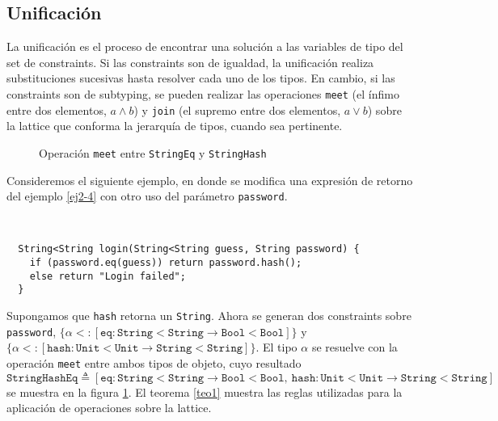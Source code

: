 \subsection{Unificación}
La unificación es el proceso de encontrar una solución a las variables de tipo del set de constraints. Si las constraints son de igualdad, la unificación realiza substituciones sucesivas hasta resolver cada uno de los tipos. En cambio, si las constraints son de subtyping, se pueden realizar las operaciones \texttt{meet} (el ínfimo entre dos elementos, $a \wedge b$) y \texttt{join} (el supremo entre dos elementos, $a \vee b$) sobre la lattice que conforma la jerarquía de tipos, cuando sea pertinente.

\begin{figure}[ht]
  \centering
  \caption{Operación \texttt{meet} entre \texttt{StringEq} y \texttt{StringHash}}
  \label{latticeInference}
\end{figure}

Consideremos el siguiente ejemplo, en donde se modifica una expresión de retorno del ejemplo \ref{ej2-4} con otro uso del parámetro \texttt{password}.

\begin{ej} \ \\
  \normalfont
  \label{ej2-5}
\begin{lstlisting}
  String<String login(String<String guess, String password) {
  	if (password.eq(guess)) return password.hash();
  	else return "Login failed";
  }
\end{lstlisting}
\end{ej}

Supongamos que \texttt{hash} retorna un \texttt{String}. Ahora se generan dos constraints sobre \texttt{password}, $\{\alpha <: [\mathtt{eq} : \mathtt{String<String} \rightarrow \mathtt{Bool<Bool}]\}$ y $\{\alpha <: [\mathtt{hash} : \mathtt{Unit<Unit} \rightarrow \mathtt{String<String}]\}$. El tipo $\alpha$ se resuelve con la operación \texttt{meet} entre ambos tipos de objeto, cuyo resultado $\mathtt{StringHashEq} \triangleq [\mathtt{eq} : \mathtt{String<String} \rightarrow \mathtt{Bool<Bool},\ \mathtt{hash} : \mathtt{Unit<Unit} \rightarrow \mathtt{String<String}]$ se muestra en la figura \ref{latticeInference}. El teorema \ref{teo1} muestra las reglas utilizadas para la aplicación de operaciones sobre la lattice.

